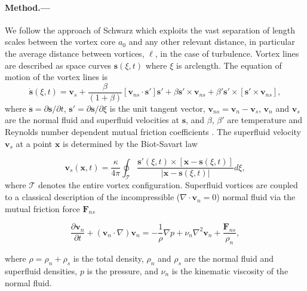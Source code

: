 \documentclass[%
 reprint,
 amsmath,amssymb,
 aps,
 prl,
]{revtex4-2}
\def \s{\mathbf{s}}
\def \v{\mathbf{v}}
\def \x{\mathbf{x}}
\begin{document}
\paragraph*{Method.---}We follow the approach of Schwarz
\cite{schwarz1988} which exploits
the vast separation of length scales between the vortex core $a_0$ and any
other relevant distance, in particular the average distance between vortices,
$\ell$, in the case of turbulence. Vortex lines are described
as space curves $\s(\xi,t)$ where $\xi$ is arclength. The equation of motion 
of the vortex lines is
\begin{equation}
	\dot{\s}(\xi,t) = \v_s + \frac{\beta}{(1+\beta)}\left[\v_{ns}\cdot \s'\right]\s' + \beta\s'\times\v_{ns}+\beta'\s'\times\left[\s'\times \v_{ns}\right],
\end{equation}
\noindent
where $\dot{\s}=\partial\s/\partial t$, $\s'=\partial\s/\partial \xi$ 
is the unit tangent vector, $\v_{ns}=\v_n - \v_s$, $\v_n$ and $\v_s$ 
are the normal fluid and superfluid velocities at $\s$,
and $\beta$, $\beta'$ are temperature and Reynolds number dependent 
mutual friction coefficients \cite{galantucciNewSelfconsistentApproach2020b}. 
The superfluid velocity $\v_s$ at a point $\x$ is determined by the 
Biot-Savart law

\begin{equation}
	\v_s(\x,t) = \frac{\kappa}{4\pi}\oint_{\mathcal{T}}\frac{\s'(\xi,t)\times\left[\x-\s(\xi,t)\right]}{|\x-\s(\xi,t)|}d\xi,
\end{equation}
where $\mathcal{T}$ denotes the entire vortex configuration. 
Superfluid vortices are coupled to a classical description of the 
incompressible ($\nabla\cdot\v_n=0$) normal fluid via the mutual 
friction force $\mathbf{F}_{ns}$

\begin{equation}
	\frac{\partial \v_n}{\partial t} + (\v_n\cdot\nabla)\v_n = 
        -\frac{1}{\rho} \nabla p + \nu_n\nabla^2\v_n + \frac{\mathbf{F}_{ns}}{\rho_n},
\end{equation}

\noindent
where $\rho=\rho_n + \rho_s$ is the total density, $\rho_n$ and 
$\rho_s$ are the normal fluid and superfluid densities, $p$ is the pressure, 
and $\nu_n$ is the kinematic viscosity of the normal fluid. 
\end{document}
